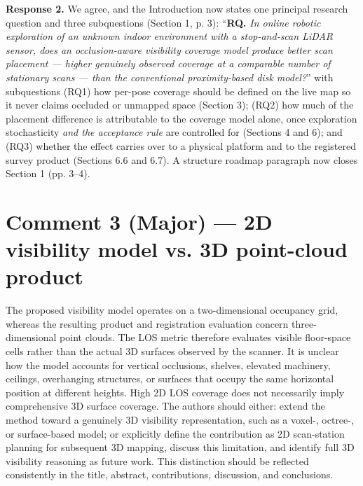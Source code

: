 \textbf{Response 2.} We agree, and the Introduction now states one principal research question and three subquestions (Section 1, p. 3):
“\textbf{RQ.} \emph{In online robotic exploration of an unknown indoor environment with a stop-and-scan LiDAR sensor, does an occlusion-aware visibility coverage model produce better scan placement — higher genuinely observed coverage at a comparable number of stationary scans — than the conventional proximity-based disk model?}”
with subquestions (RQ1) how per-pose coverage should be defined on the live map so it never claims occluded or unmapped space (Section 3); (RQ2) how much of the placement difference is attributable to the coverage model alone, once exploration stochasticity \emph{and the acceptance rule} are controlled for (Sections 4 and 6); and (RQ3) whether the effect carries over to a physical platform and to the registered survey product (Sections 6.6 and 6.7). A structure roadmap paragraph now closes Section 1 (pp. 3–4).

\section*{Comment 3 (Major) — 2D visibility model vs. 3D point-cloud product}

\begin{quoting}
The proposed visibility model operates on a two-dimensional occupancy grid, whereas the resulting product and registration evaluation concern three-dimensional point clouds. The LOS metric therefore evaluates visible floor-space cells rather than the actual 3D surfaces observed by the scanner. It is unclear how the model accounts for vertical occlusions, shelves, elevated machinery, ceilings, overhanging structures, or surfaces that occupy the same horizontal position at different heights. High 2D LOS coverage does not necessarily imply comprehensive 3D surface coverage. The authors should either: extend the method toward a genuinely 3D visibility representation, such as a voxel-, octree-, or surface-based model; or explicitly define the contribution as 2D scan-station planning for subsequent 3D mapping, discuss this limitation, and identify full 3D visibility reasoning as future work. This distinction should be reflected consistently in the title, abstract, contributions, discussion, and conclusions.
\end{quoting}

